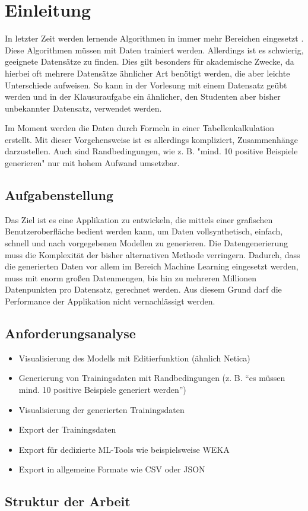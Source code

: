 
\chapter{Einleitung}

In letzter Zeit werden lernende Algorithmen in immer mehr Bereichen eingesetzt \cite{mengesonnentag:2018}. Diese Algorithmen müssen mit Daten trainiert werden. Allerdings ist es schwierig, geeignete Datensätze zu finden. Dies gilt besonders für akademische Zwecke, da hierbei oft mehrere Datensätze ähnlicher Art benötigt werden, die aber leichte Unterschiede aufweisen. So kann in der Vorlesung mit einem Datensatz geübt werden und in der Klausuraufgabe ein ähnlicher, den Studenten aber bisher unbekannter Datensatz, verwendet werden.

Im Moment werden die Daten durch Formeln in einer Tabellenkalkulation erstellt. Mit dieser Vorgehensweise ist es allerdings kompliziert, Zusammenhänge darzustellen. Auch sind Randbedingungen, wie z. B. "mind. 10 positive Beispiele generieren" nur mit hohem Aufwand umsetzbar.

\section{Aufgabenstellung}

Das Ziel ist es eine Applikation zu entwickeln, die mittels einer grafischen Benutzeroberfläche bedient werden kann, um Daten vollsynthetisch, einfach, schnell und nach vorgegebenen Modellen zu generieren. Die Datengenerierung muss die Komplexität der bisher alternativen Methode verringern. Dadurch, dass die generierten Daten vor allem im Bereich Machine Learning eingesetzt werden, muss mit enorm großen Datenmengen, bis hin zu mehreren Millionen Datenpunkten pro Datensatz, gerechnet werden. Aus diesem Grund darf die Performance der Applikation nicht vernachlässigt werden.

\section{Anforderungsanalyse}
\label{sec:anforderungsanalyse}

\begin{itemize}
    \item Visualisierung des Modells mit Editierfunktion (ähnlich Netica)
    \item Generierung von Trainingsdaten mit Randbedingungen (z. B. \enquote{es müssen mind. 10 positive Beispiele generiert werden})
    \item Visualisierung der generierten Trainingsdaten
    \item Export der Trainingsdaten
    \item Export für dedizierte ML-Tools wie beispielsweise WEKA
    \item Export in allgemeine Formate wie CSV oder JSON 
\end{itemize}

\section{Struktur der Arbeit}

